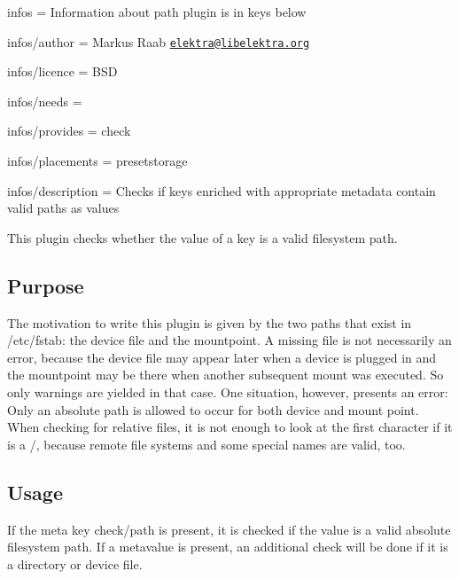 
\begin{DoxyItemize}
\item infos = Information about path plugin is in keys below
\item infos/author = Markus Raab \href{mailto:elektra@libelektra.org}{\tt elektra@libelektra.\+org}
\item infos/licence = B\+S\+D
\item infos/needs =
\item infos/provides = check
\item infos/placements = presetstorage
\item infos/description = Checks if keys enriched with appropriate metadata contain valid paths as values
\end{DoxyItemize}

This plugin checks whether the value of a key is a valid filesystem path.

\subsection*{Purpose}

The motivation to write this plugin is given by the two paths that exist in /etc/fstab\+: the device file and the mountpoint. A missing file is not necessarily an error, because the device file may appear later when a device is plugged in and the mountpoint may be there when another subsequent mount was executed. So only warnings are yielded in that case. One situation, however, presents an error\+: Only an absolute path is allowed to occur for both device and mount point. When checking for relative files, it is not enough to look at the first character if it is a {\ttfamily /}, because remote file systems and some special names are valid, too.

\subsection*{Usage}

If the meta key {\ttfamily check/path} is present, it is checked if the value is a valid absolute filesystem path. If a metavalue is present, an additional check will be done if it is a directory or device file. 
